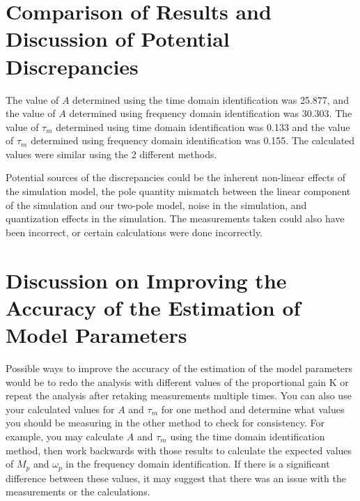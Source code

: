\documentclass[12pt]{article}
\begin{document}
\section*{Comparison of Results and Discussion of Potential Discrepancies}
The value of $A$ determined using the time domain identification was 25.877, and the value of $A$ determined using frequency domain identification was 30.303. The value of $\tau_m$ determined using time domain identification was 0.133 and the value of $\tau_m$ determined using frequency domain identification was 0.155. The calculated values were similar using the 2 different methods. 

Potential sources of the discrepancies could be the inherent non-linear effects of the simulation model, the pole quantity mismatch between the linear component of the simulation and our two-pole model, noise in the simulation, and quantization effects in the simulation. The measurements taken could also have been incorrect, or certain calculations were done incorrectly.

\section*{Discussion on Improving the Accuracy of the Estimation of Model Parameters}
Possible ways to improve the accuracy of the estimation of the model parameters would be to redo the analysis with different values of the proportional gain K or repeat the analysis after retaking measurements multiple times. You can also use your calculated values for $A$ and $\tau_m$ for one method and determine what values you should be measuring in the other method to check for consistency. For example, you may calculate $A$ and $\tau_m$ using the time domain identification method, then work backwards with those results to calculate the expected values of $M_p$ and $\omega_p$ in the frequency domain identification. If there is a significant difference between these values, it may suggest that there was an issue with the measurements or the calculations.
\end{document}
